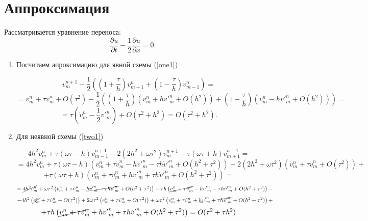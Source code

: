 \section{Аппроксимация}

Рассматривается уравнение переноса:
\[
\frac{\partial u}{\partial t} - \frac{1}{2}
\frac{\partial u}{\partial x} = 0.
\] 

\begin{enumerate}
\item Посчитаем апроксимацию для явной схемы (\ref{one1})

\[
v_m^{n+1} - \frac{1}{2} \left( \left(1 + \frac{\tau}{h} \right)v^n_{m+1} + \left(1 - \frac{\tau}{h} \right)v^n_{m-1}  \right) =
\]
\[
= v_m^n + \tau {\dot v}_m^n + O(\tau^2) - \frac{1}{2} \left( \left(1 + \frac{\tau}{h} \right)\left(v_m^n + h {v'}_m^n + O(h^2)\right) +\left(1 - \frac{\tau}{h} \right) \left(v_m^n - h {v'}_m^n + O(h^2) \right)  \right) = 
\]
\[
 = \tau \left({\dot v}_m^n    - \frac{1}{2}  {v'}_m^n \right) + O(\tau^2+h^2) = O(\tau^2+h^2).
\]

\item Для неявной схемы (\ref{two1})

\[
4h^2 v_m^n + \tau
\left(\omega \tau -h \right) v_{m-1}^{n+1} -
2\left(2h^2 + \omega \tau^2\right) v_{m}^{n+1} +
\tau \left( \omega \tau + h \right) v_{m+1}^{n+1} = 
\]
\[
=4h^2 v_m^n
+  \tau \left(\omega \tau -h \right) \left(v_m^n+ \tau {\dot v}_m^n - h {v'}_m^n - \tau h {\dot v'}_m^n + O(h^2 + \tau^2)\right)
- 2\left(2h^2 + \omega \tau^2\right) \left( v_m^n+ \tau{\dot v}_m^n + O(\tau^2)\right) +\]
\[
+ \tau \left( \omega \tau + h \right) \left(v_m^n+ \tau {\dot v}_m^n + h {v'}_m^n + \tau h {\dot v'}_m^n + O(h^2 + \tau^2)\right)
= 
\]
\[
=\cancel{4h^2 v_m^n}
+  \omega \tau^2  \left(v_m^n+ \tau {\dot v}_m^n - \cancel{h {v'}_m^n - \tau h {\dot v'}_m^n} + O(h^2 + \tau^2)\right)
- \tau h   \left(\cancel{v_m^n+ \tau {\dot v}_m^n}   -  h {v'}_m^n - \tau h {\dot v'}_m^n + O(h^2 + \tau^2)\right) - 
\]
\[
- 4h^2 \left( \cancel{v_m^n} + \tau{\dot v}_m^n + O(\tau^2)\right) + 2\omega \tau^2\left( v_m^n+ \tau{\dot v}_m^n + O(\tau^2)\right) 
+ \omega \tau^2 \left(v_m^n+ \tau {\dot v}_m^n + \cancel{h {v'}_m^n + \tau h {\dot v'}_m^n} + O(h^2 + \tau^2)\right) +
\]
\[
+
\tau h \left(\cancel{v_m^n+ \tau {\dot v}_m^n} + h {v'}_m^n + \tau h {\dot v'}_m^n + O(h^2 + \tau^2)\right)
= O(\tau^2 + \tau h^2)
\]

\end{enumerate}



